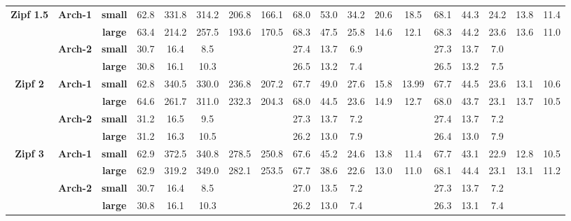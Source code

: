 \documentclass[10pt, conference, compsocconf]{IEEEtran}
\begin{document}
\begin{table}[]
{\begin{tabular}{ccc||ccccc|ccccc|ccccc}
\multicolumn{1}{c}{\multirow{4}{*}{\textbf{Zipf 1.5}}} 
&\multirow{2}{*}{\textbf{Arch-1}} & \textbf{small}  & 62.8  & 331.8  & 314.2  & 206.8  & 166.1 & 68.0  & 53.0  & 34.2  & 20.6  & 18.5  & 68.1  & 44.3  & 24.2    & 13.8  & 11.4 \\
&& \textbf{large} & 63.4  & 214.2  & 257.5  & 193.6  & 170.5  & 68.3  & 47.5  & 25.8  & 14.6& 12.1&68.3&44.2&23.6&13.6& 11.0 \\ \cline{2-18}
&\multirow{2}{*}{\textbf{Arch-2}}  & \textbf{small}  & 30.7  & 16.4   & 8.5   &        &       & 27.4  & 13.7  & 6.9  &       &       & 27.3  & 13.7  & 7.0  &       &      \\
&& \textbf{large} & 30.8 & 16.1   & 10.3   &        &       & 26.5  & 13.2  & 7.4  &       &       & 26.5  & 13.2  & 7.5  &       &  \\ \hline 

\multicolumn{1}{c}{\multirow{4}{*}{\textbf{Zipf 2}}} 
&\multirow{2}{*}{\textbf{Arch-1}} & \textbf{small}  & 62.8  & 340.5  & 330.0  & 236.8  & 207.2 & 67.7  & 49.0  & 27.6  & 15.8  & 13.99  & 67.7  & 44.5  & 23.6    & 13.1  & 10.6 \\
&& \textbf{large} & 64.6  & 261.7  & 311.0  & 232.3  & 204.3  & 68.0  & 44.5  & 23.6  & 14.9& 12.7&68.0&43.7&23.1&13.7& 10.5 \\ \cline{2-18}
&\multirow{2}{*}{\textbf{Arch-2}}  & \textbf{small}  & 31.2  & 16.5   & 9.5   &        &       & 27.3  & 13.7  & 7.2  &       &       & 27.4  & 13.7  & 7.2  &       &      \\
&& \textbf{large} & 31.2 & 16.3   & 10.5   &        &       & 26.2  & 13.0  & 7.9  &       &       & 26.4  & 13.0  & 7.9  &       &  \\ \hline 

\multicolumn{1}{c}{\multirow{4}{*}{\textbf{Zipf 3}}} 
&\multirow{2}{*}{\textbf{Arch-1}} & \textbf{small}  & 62.9  & 372.5  & 340.8  & 278.5  & 250.8 & 67.6  & 45.2  & 24.6  & 13.8  & 11.4  & 67.7  & 43.1  & 22.9    & 12.8  & 10.5 \\
&& \textbf{large} & 62.9  & 319.2  & 349.0  & 282.1  & 253.5  & 67.7  & 38.6  & 22.6  & 13.0& 11.0&68.1&44.4&23.1&13.1& 11.2 \\ \cline{2-18}
&\multirow{2}{*}{\textbf{Arch-2}}  & \textbf{small}  & 30.7  & 16.4   & 8.5   &        &       & 27.0  & 13.5  & 7.2  &       &       & 27.3  & 13.7  & 7.2  &       &      \\
&& \textbf{large} & 30.8 & 16.1   & 10.3   &        &       & 26.2  & 13.0  & 7.4  &       &       & 26.3  & 13.1  & 7.4  &       &  \\ \hline 


\end{tabular}}
\end{table}
\end{document}
